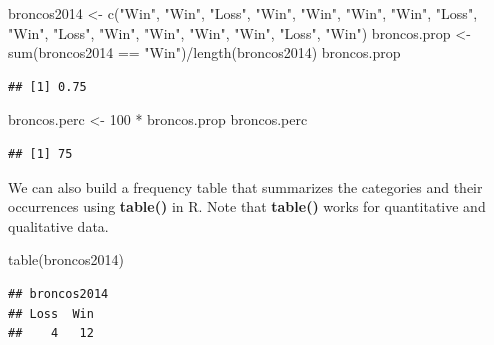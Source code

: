 \documentclass[
  11pt,
]{book}
\newenvironment{Shaded}{\begin{snugshade}}{\end{snugshade}}
\newcommand{\DecValTok}[1]{\textcolor[rgb]{0.00,0.00,0.81}{#1}}
\newcommand{\FunctionTok}[1]{\textcolor[rgb]{0.00,0.00,0.00}{#1}}
\newcommand{\NormalTok}[1]{#1}
\newcommand{\OtherTok}[1]{\textcolor[rgb]{0.56,0.35,0.01}{#1}}
\newcommand{\SpecialCharTok}[1]{\textcolor[rgb]{0.00,0.00,0.00}{#1}}
\newcommand{\StringTok}[1]{\textcolor[rgb]{0.31,0.60,0.02}{#1}}
\theoremstyle{definition}
\theoremstyle{definition}
\theoremstyle{definition}
\theoremstyle{definition}
\theoremstyle{remark}
\begin{document}
\hfill\break
\hfill\break
\hfill\break
\hfill\break
\hfill\break

\begin{Shaded}
\begin{Highlighting}[]
\NormalTok{broncos2014 }\OtherTok{\textless{}{-}} \FunctionTok{c}\NormalTok{(}\StringTok{"Win"}\NormalTok{, }\StringTok{"Win"}\NormalTok{, }\StringTok{"Loss"}\NormalTok{, }\StringTok{"Win"}\NormalTok{, }\StringTok{"Win"}\NormalTok{, }\StringTok{"Win"}\NormalTok{, }\StringTok{"Win"}\NormalTok{, }\StringTok{"Loss"}\NormalTok{, }\StringTok{"Win"}\NormalTok{,}
    \StringTok{"Loss"}\NormalTok{, }\StringTok{"Win"}\NormalTok{, }\StringTok{"Win"}\NormalTok{, }\StringTok{"Win"}\NormalTok{, }\StringTok{"Win"}\NormalTok{, }\StringTok{"Loss"}\NormalTok{, }\StringTok{"Win"}\NormalTok{)}
\NormalTok{broncos.prop }\OtherTok{\textless{}{-}} \FunctionTok{sum}\NormalTok{(broncos2014 }\SpecialCharTok{==} \StringTok{"Win"}\NormalTok{)}\SpecialCharTok{/}\FunctionTok{length}\NormalTok{(broncos2014)}
\NormalTok{broncos.prop}
\end{Highlighting}
\end{Shaded}

\begin{verbatim}
## [1] 0.75
\end{verbatim}

\begin{Shaded}
\begin{Highlighting}[]
\NormalTok{broncos.perc }\OtherTok{\textless{}{-}} \DecValTok{100} \SpecialCharTok{*}\NormalTok{ broncos.prop}
\NormalTok{broncos.perc}
\end{Highlighting}
\end{Shaded}

\begin{verbatim}
## [1] 75
\end{verbatim}

We can also build a frequency table that summarizes the categories and their occurrences using \textbf{table()} in R. Note that \textbf{table()} works for quantitative and qualitative data.

\begin{Shaded}
\begin{Highlighting}[]
\FunctionTok{table}\NormalTok{(broncos2014)}
\end{Highlighting}
\end{Shaded}

\begin{verbatim}
## broncos2014
## Loss  Win 
##    4   12
\end{verbatim}
\end{document}
